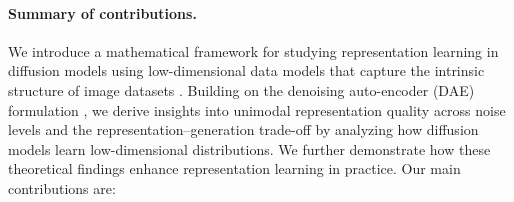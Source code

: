 

\paragraph{Summary of contributions.}
We introduce a mathematical framework for studying representation learning in diffusion models using low-dimensional data models that capture the intrinsic structure of image datasets \citep{pope2021intrinsic,stanczuk2022your}. Building on the denoising auto-encoder (DAE) formulation \citep{vincent2008extracting,vincent2010stacked,vincent2011connection}, we derive insights into unimodal representation quality across noise levels and the representation–generation trade-off by analyzing how diffusion models learn low-dimensional distributions. We further demonstrate how these theoretical findings enhance representation learning in practice. Our main contributions are:

